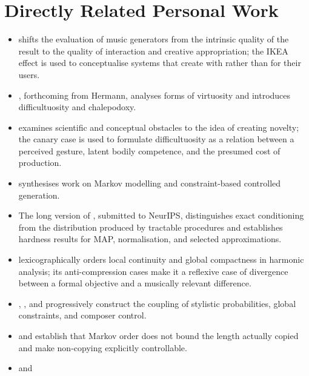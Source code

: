 \documentclass[11pt,a4paper]{article}
\begin{document}
\clearpage
\section{Directly Related Personal Work}

\begin{itemize}
  \item \textcite{pachet2026generation} shifts the evaluation of music
        generators from the intrinsic quality of the result to the quality of
        interaction and creative appropriation; the IKEA effect is used to
        conceptualise systems that create with rather than for their users.
  \item \textcite{pachet2027virtuosite}, forthcoming from Hermann, analyses
        forms of virtuosity and introduces difficultuosity and chalepodoxy.
  \item \textcite{pachet2026impossibilite} examines scientific and conceptual
        obstacles to the idea of creating novelty; the canary case is used to
        formulate difficultuosity as a relation between a perceived gesture,
        latent bodily competence, and the presumed cost of production.
  \item \textcite{pachet2026markov} synthesises work on Markov modelling and
        constraint-based controlled generation.
  \item The long version of \textcite{pachet2026biases}, submitted to NeurIPS,
        distinguishes exact conditioning from the distribution produced by
        tractable procedures and establishes hardness results for MAP,
        normalisation, and selected approximations.
  \item \textcite{pachet2026tonalparsimony} lexicographically orders local
        continuity and global compactness in harmonic analysis; its
        anti-compression cases make it a reflexive case of divergence between a
        formal objective and a musically relevant difference.
  \item \textcite{pachet2011markov}, \textcite{barbieri2012lyrics}, and
        \textcite{papadopoulos2016flowcomposer} progressively construct the
        coupling of stylistic probabilities, global constraints, and composer
        control.
  \item \textcite{papadopoulos2014avoiding} and
        \textcite{papadopoulos2016nonplagiaristic} establish that Markov order
        does not bound the length actually copied and make non-copying explicitly
        controllable.
  \item \textcite{ghedini2015flowmachines} and

\end{itemize}
\end{document}
